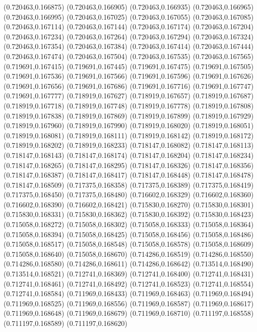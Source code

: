 (0.720463,0.166875)
(0.720463,0.166905)
(0.720463,0.166935)
(0.720463,0.166965)
(0.720463,0.166995)
(0.720463,0.167025)
(0.720463,0.167055)
(0.720463,0.167085)
(0.720463,0.167114)
(0.720463,0.167144)
(0.720463,0.167174)
(0.720463,0.167204)
(0.720463,0.167234)
(0.720463,0.167264)
(0.720463,0.167294)
(0.720463,0.167324)
(0.720463,0.167354)
(0.720463,0.167384)
(0.720463,0.167414)
(0.720463,0.167444)
(0.720463,0.167474)
(0.720463,0.167504)
(0.720463,0.167535)
(0.720463,0.167565)
(0.719691,0.167415)
(0.719691,0.167445)
(0.719691,0.167475)
(0.719691,0.167505)
(0.719691,0.167536)
(0.719691,0.167566)
(0.719691,0.167596)
(0.719691,0.167626)
(0.719691,0.167656)
(0.719691,0.167686)
(0.719691,0.167716)
(0.719691,0.167747)
(0.719691,0.167777)
(0.718919,0.167627)
(0.718919,0.167657)
(0.718919,0.167687)
(0.718919,0.167718)
(0.718919,0.167748)
(0.718919,0.167778)
(0.718919,0.167808)
(0.718919,0.167838)
(0.718919,0.167869)
(0.718919,0.167899)
(0.718919,0.167929)
(0.718919,0.167960)
(0.718919,0.167990)
(0.718919,0.168020)
(0.718919,0.168051)
(0.718919,0.168081)
(0.718919,0.168111)
(0.718919,0.168142)
(0.718919,0.168172)
(0.718919,0.168202)
(0.718919,0.168233)
(0.718147,0.168082)
(0.718147,0.168113)
(0.718147,0.168143)
(0.718147,0.168174)
(0.718147,0.168204)
(0.718147,0.168234)
(0.718147,0.168265)
(0.718147,0.168295)
(0.718147,0.168326)
(0.718147,0.168356)
(0.718147,0.168387)
(0.718147,0.168417)
(0.718147,0.168448)
(0.718147,0.168478)
(0.718147,0.168509)
(0.717375,0.168358)
(0.717375,0.168389)
(0.717375,0.168419)
(0.717375,0.168450)
(0.717375,0.168480)
(0.716602,0.168329)
(0.716602,0.168360)
(0.716602,0.168390)
(0.716602,0.168421)
(0.715830,0.168270)
(0.715830,0.168301)
(0.715830,0.168331)
(0.715830,0.168362)
(0.715830,0.168392)
(0.715830,0.168423)
(0.715058,0.168272)
(0.715058,0.168302)
(0.715058,0.168333)
(0.715058,0.168364)
(0.715058,0.168394)
(0.715058,0.168425)
(0.715058,0.168456)
(0.715058,0.168486)
(0.715058,0.168517)
(0.715058,0.168548)
(0.715058,0.168578)
(0.715058,0.168609)
(0.715058,0.168640)
(0.715058,0.168670)
(0.714286,0.168519)
(0.714286,0.168550)
(0.714286,0.168580)
(0.714286,0.168611)
(0.714286,0.168642)
(0.713514,0.168490)
(0.713514,0.168521)
(0.712741,0.168369)
(0.712741,0.168400)
(0.712741,0.168431)
(0.712741,0.168461)
(0.712741,0.168492)
(0.712741,0.168523)
(0.712741,0.168554)
(0.712741,0.168584)
(0.711969,0.168433)
(0.711969,0.168463)
(0.711969,0.168494)
(0.711969,0.168525)
(0.711969,0.168556)
(0.711969,0.168587)
(0.711969,0.168617)
(0.711969,0.168648)
(0.711969,0.168679)
(0.711969,0.168710)
(0.711197,0.168558)
(0.711197,0.168589)
(0.711197,0.168620)
